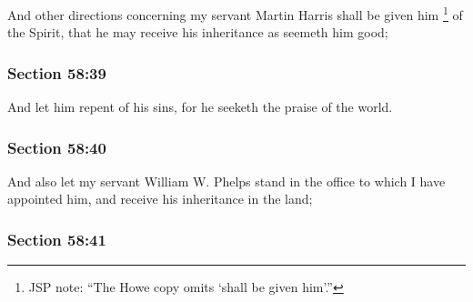 		And other directions concerning my servant Martin Harris shall be given him%
			\footnote{%
				JSP note: ``The Howe copy omits `shall be given him'.''
				}
		of the Spirit, that he may receive his inheritance as seemeth him good;


	\subsubsection{Section 58:39} %
		\label{DC58-39}

		And let him repent of his sins, for he seeketh the praise of the world.


	\subsubsection{Section 58:40} %
		\label{DC58-40}

		And also let my servant William W. Phelps stand in the office to which I have appointed him, and receive his inheritance in the land;


	\subsubsection{Section 58:41} %
		\label{DC58-41}

